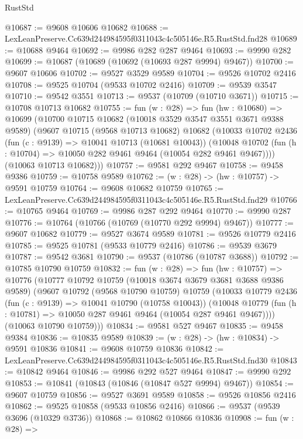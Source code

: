 \begin{lexlean}{RustStd}
\begin{coremodule}
@10687 := @9608 @10606 @10682
@10688 := LexLeanPreserve.Cc639d244984595f0311043c4c505146e.R5.RustStd.fnd28
@10689 := @10688 @9464
@10692 := @9986 @282 @287 @9464
@10693 := @9990 @282
@10699 := @10687 (@10689 (@10692 (@10693 @287 @9994) @9467))
@10700 := @9607 @10606
@10702 := @9527 @3529 @9589
@10704 := @9526 @10702 @2416
@10708 := @9525 @10704 (@9533 @10702 @2416)
@10709 := @9539 @3547
@10710 := @9542 @3551
@10713 := @9537 (@10709 (@10710 @3671))
@10715 := @10708 @10713 @10682
@10755 := fun (w : @28) =>
  fun (hw : @10680) =>
  @10699
    (@10700
      @10715
      @10682
      (@10018 @3529 @3547 @3551 @3671 @9388 @9589)
      (@9607
        @10715
        (@9568 @10713 @10682)
        @10682
        (@10033
          @10702
          @2436
          (fun (c : @9139) => @10041 @10713 (@10681 @10043))
          (@10048 @10702 (fun (h : @10704) => @10050 @282 @9461 @9464 (@10054 @282 @9461 @9467))))
        (@10063 @10713 @10682)))
@10757 := @9581 @292 @9467
@10758 := @9458 @9386
@10759 := @10758 @9589
@10762 := (w : @28) -> (hw : @10757) -> @9591 @10759
@10764 := @9608 @10682 @10759
@10765 := LexLeanPreserve.Cc639d244984595f0311043c4c505146e.R5.RustStd.fnd29
@10766 := @10765 @9464
@10769 := @9986 @287 @292 @9464
@10770 := @9990 @287
@10776 := @10764 (@10766 (@10769 (@10770 @292 @9994) @9467))
@10777 := @9607 @10682
@10779 := @9527 @3674 @9589
@10781 := @9526 @10779 @2416
@10785 := @9525 @10781 (@9533 @10779 @2416)
@10786 := @9539 @3679
@10787 := @9542 @3681
@10790 := @9537 (@10786 (@10787 @3688))
@10792 := @10785 @10790 @10759
@10832 := fun (w : @28) =>
  fun (hw : @10757) =>
  @10776
    (@10777
      @10792
      @10759
      (@10018 @3674 @3679 @3681 @3688 @9386 @9589)
      (@9607
        @10792
        (@9568 @10790 @10759)
        @10759
        (@10033
          @10779
          @2436
          (fun (c : @9139) => @10041 @10790 (@10758 @10043))
          (@10048 @10779 (fun (h : @10781) => @10050 @287 @9461 @9464 (@10054 @287 @9461 @9467))))
        (@10063 @10790 @10759)))
@10834 := @9581 @527 @9467
@10835 := @9458 @9384
@10836 := @10835 @9589
@10839 := (w : @28) -> (hw : @10834) -> @9591 @10836
@10841 := @9608 @10759 @10836
@10842 := LexLeanPreserve.Cc639d244984595f0311043c4c505146e.R5.RustStd.fnd30
@10843 := @10842 @9464
@10846 := @9986 @292 @527 @9464
@10847 := @9990 @292
@10853 := @10841 (@10843 (@10846 (@10847 @527 @9994) @9467))
@10854 := @9607 @10759
@10856 := @9527 @3691 @9589
@10858 := @9526 @10856 @2416
@10862 := @9525 @10858 (@9533 @10856 @2416)
@10866 := @9537 (@9539 @3696 (@10329 @3736))
@10868 := @10862 @10866 @10836
@10908 := fun (w : @28) =>

\end{coremodule}
\end{lexlean}
